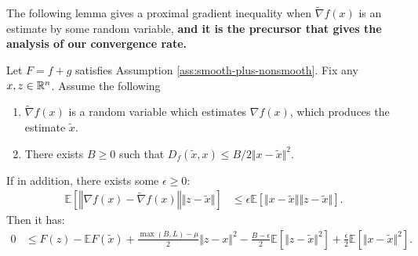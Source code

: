 \documentclass[12pt]{article}
\newcommand{\expect}{\ensuremath{\mathbb E}}
\begin{document}
        \par
        The following lemma gives a proximal gradient inequality when $\tilde \nabla f(x)$ is an estimate by some random variable, \textbf{and it is the precursor that gives the analysis of our convergence rate.} 
        \begin{lemma}\label{lemma:pg-stoch-ineq}
            Let $F = f + g$ satisfies Assumption \ref{ass:smooth-plus-nonsmooth}. 
            Fix any $x, z \in \mathbb R^n$. 
            Assume the following
            \begin{enumerate}[nosep]
                \item $\tilde \nabla f(x)$ is a random variable which estimates $\nabla f(x)$, which produces the estimate $\tilde x$. 
                \item There exists $B \ge 0$ such that $D_f(\tilde x,x)\le B/2 \Vert x - \tilde x\Vert^2$. 
            \end{enumerate}
            If in addition, there exists some $\epsilon \ge 0$: 
            \begin{align*}
                \expect \left[
                    \left\Vert \nabla f(x) - \tilde \nabla f(x)\right\Vert 
                    \Vert z - \tilde x\Vert
                \right] &\le 
                \epsilon \expect \left[
                    \Vert x - \tilde x\Vert\Vert z - \tilde x\Vert
                \right]. 
            \end{align*}
            Then it has: 
            \begin{align*}
                0 &\le 
                F(z) - \expect F(\tilde x) + \frac{\max(B, L) - \mu}{2} \Vert z - x\Vert^2
                - \frac{B - \epsilon}{2}\expect\left[\Vert z - \tilde x\Vert^2\right]
                + \frac{\epsilon}{2} \expect\left[\Vert x - \tilde x\Vert^2\right]. 
            \end{align*}
        \end{lemma}
\end{document}
